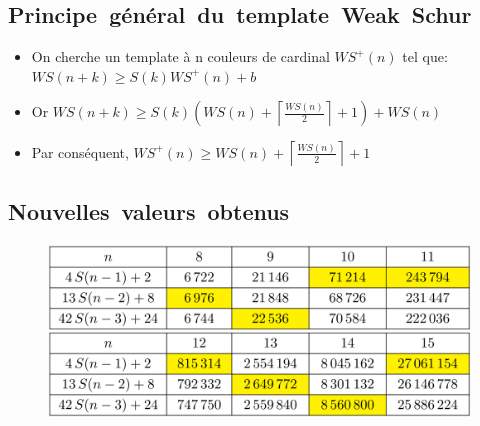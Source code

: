 \documentclass[graphics]{beamer}
\begin{document}
\subsection{Principe~général~du~template~Weak~Schur}
\begin{frame}


\begin{itemize}
\item On cherche un template à n couleurs de cardinal $WS^+(n)$ tel que:
\newline $WS(n+k) \geqslant S(k)WS^+(n)+b$
\vspace{8 mm}
\item Or $WS (n+k) \geqslant S(k) \left (WS (n) + \left \lceil 					\displaystyle \frac{WS (n)}{2}
			\right \rceil +1 \right) + WS (n)$
			\vspace{8 mm}
\item Par conséquent, $WS^+(n) \geqslant WS (n) + \left \lceil 					\displaystyle \frac{WS (n)}{2}
			\right \rceil +1 $
\end{itemize}

\end{frame}

\subsection{Nouvelles~valeurs~obtenus}

\begin{frame}
\begin{figure}
        \centering
        \includegraphics[scale=0.30]{tableau_resultat.png}
\end{figure}

\end{frame}
\end{document}
